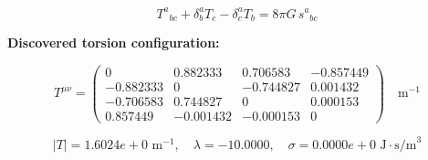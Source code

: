 
\begin{equation}
  T^a{}_{bc} + \delta^a_b T_c - \delta^a_c T_b = 8\pi G \, s^a{}_{bc}
\end{equation}

\textbf{Discovered torsion configuration:}

\begin{equation}
  T^{\mu\nu} = \begin{pmatrix}
    0 & 0.882333 & 0.706583 & -0.857449 \\
    -0.882333 & 0 & -0.744827 & 0.001432 \\
    -0.706583 & 0.744827 & 0 & 0.000153 \\
    0.857449 & -0.001432 & -0.000153 & 0
  \end{pmatrix} \quad \text{m}^{-1}
\end{equation}

\begin{equation}
  |T| = 1.6024e+0 \text{ m}^{-1}, \quad
  \lambda = -10.0000, \quad
  \sigma = 0.0000e+0 \text{ J}\cdot\text{s/m}^3
\end{equation}